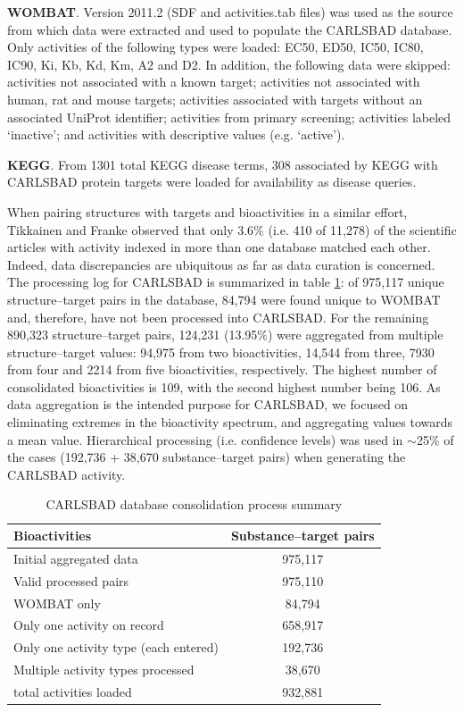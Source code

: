 \textbf{WOMBAT}. Version 2011.2 (SDF and activities.tab files) was used as the source from which data were extracted and used to populate the CARLSBAD database. Only activities of the following types were loaded: EC50, ED50, IC50, IC80, IC90, Ki, Kb, Kd, Km, A2 and D2. In addition, the following data were skipped: activities not associated with a known target; activities not associated with human, rat and mouse targets; activities associated with targets without an associated UniProt identifier; activities from primary screening; activities labeled ‘inactive’; and activities with descriptive values (e.g. ‘active’).

\textbf{KEGG}. From 1301 total KEGG disease terms, 308 associated by KEGG with CARLSBAD protein targets were loaded for availability as disease queries.

When pairing structures with targets and bioactivities in a similar effort, Tikkainen and Franke observed that only 3.6\% (i.e. 410 of 11,278) of the scientific articles with activity indexed in more than one database matched each other. Indeed, data discrepancies are ubiquitous as far as data curation is concerned\cite{Tiikkainen2012-cw}. The processing log for CARLSBAD is summarized in table \ref{tab:cb_01}: of 975,117 unique structure–target pairs in the database, 84,794 were found unique to WOMBAT and, therefore, have not been processed into CARLSBAD. For the remaining 890,323 structure–target pairs, 124,231 (13.95\%) were aggregated from multiple structure–target values: 94,975 from two bioactivities, 14,544 from three, 7930 from four and 2214 from five bioactivities, respectively. The highest number of consolidated bioactivities is 109, with the second highest number being 106. As data aggregation is the intended purpose for CARLSBAD, we focused on eliminating extremes in the bioactivity spectrum, and aggregating values towards a mean value. Hierarchical processing (i.e. confidence levels) was used in $\sim$25\% of the cases (192,736 + 38,670 substance–target pairs) when generating the CARLSBAD activity.

\begin{table}
\caption{CARLSBAD database consolidation process summary}
\label{tab:cb_01}
\centering
\begin{tabular}{l|c}
\hline
\textbf{Bioactivities} & \textbf{Substance–target pairs}\\
\hline
Initial aggregated data & 975,117\\
Valid processed pairs & 975,110\\
WOMBAT only & 84,794\\
Only one activity on record & 658,917\\
Only one activity type (each entered) & 192,736\\ 
Multiple activity types processed & 38,670\\
total activities loaded & 932,881\\
\hline
\end{tabular}
\end{table}


